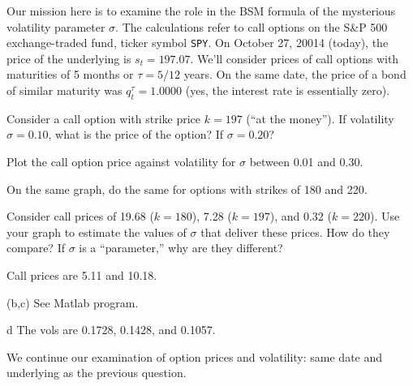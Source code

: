 \documentclass[11pt]{exam}
\begin{document}
\begin{questions}
Our mission here is to examine the role in the BSM formula of the
mysterious volatility parameter  $\sigma$.
The calculations refer to call options on the S\&P 500 exchange-traded fund,
ticker symbol {\tt SPY}.
On October 27, 20014 (today), the price of the underlying is $ s_t = 197.07$.
We'll consider prices of call options with maturities of
5 months or $ \tau = 5/12 $ years.
On the same date, the price of a bond of similar maturity was
$ q_t^\tau = 1.0000$ (yes, the interest rate is essentially zero).
\begin{parts}
\item  Consider a call option with strike price $k = 197$
(``at the money'').
If volatility $\sigma = 0.10$,
what is the price of the option?  If $\sigma = 0.20$?
\item Plot the call option price against volatility for  $\sigma$ between 0.01 and 0.30.
\item On the same graph, do the same for options with strikes of
180 and 220.
\item Consider call prices of
19.68 ($k=180$),
7.28 ($k=197$),
and 0.32 ($k=220$).
Use your graph to estimate the values of $\sigma$ that deliver these prices.
How do they compare?
If $\sigma$ is a ``parameter,'' why are they different?
\end{parts}

\begin{solution}
\begin{parts}
\item Call prices are 5.11 and 10.18.  
\item [(b,c)] See Matlab program.
\item [d] The vols are 0.1728, 0.1428, and 0.1057. 
\end{parts}
\end{solution}


We continue our examination of option prices and volatility:
same date and underlying as the previous question.


\end{questions}
\end{document}
